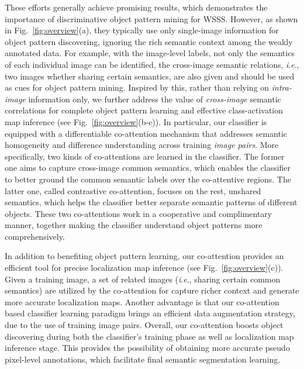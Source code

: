 \documentclass[runningheads]{llncs}
\newcommand{\ie}{\textit{i}.\textit{e}.}
\begin{document}
These efforts generally achieve promising results, which demonstrates the importance of discriminative object pattern mining for WSSS. However, as shown in Fig.~\ref{fig:overview}(a), they typically use only single-image information for object pattern discovering, ignoring the rich semantic context among the weakly annotated data. For example, with the image-level labels, not only the semantics of each individual image can be identified, the cross-image semantic relations, \ie, two images whether sharing certain semantics, are also given and should be used as cues for object pattern mining. Inspired by this, rather than relying on \textit{intra-image} information only,  we further address the value of \textit{cross-image} semantic correlations for  complete object pattern learning and effective class-activation map inference (see Fig.~\ref{fig:overview}(b-c)). In particular, our classifier is equipped with a differentiable co-attention mechanism that addresses semantic  homogeneity
and difference understanding across training \textit{image pairs}.  More specifically, two kinds of co-attentions are learned in the classifier. The former one aims to capture cross-image common semantics, which enables the classifier to better ground the common semantic labels over the co-attentive regions. The latter one, called contrastive co-attention, focuses on the rest, unshared semantics, which helps the classifier better separate semantic patterns of different objects. These two co-attentions work in a cooperative and complimentary manner, together making the classifier understand object patterns more comprehensively.

In addition to benefiting object pattern learning, our co-attention provides an efficient tool for precise localization map inference  (see Fig.~\ref{fig:overview}(c)). Given a training image, a set of related images (\ie, sharing certain common semantics) are utilized by the co-attention for  capture richer context and generate more accurate localization maps.  Another advantage is that our co-attention based classifier learning paradigm brings an efficient data augmentation strategy, due to the use of training image pairs. Overall,  our co-attention boosts object discovering during both the classifier's training phase as well as localization map inference stage. This provides the possibility of obtaining more accurate pseudo pixel-level annotations, which facilitate final semantic segmentation learning.
\end{document}
